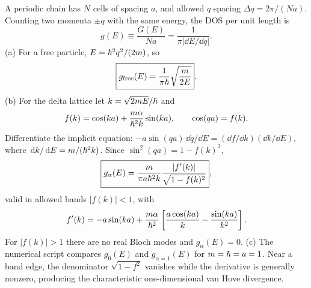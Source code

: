 A periodic chain has $N$ cells of spacing
$a$, and allowed $q$ spacing
$\Delta q=2\pi/(Na)$. Counting two
momenta $\pm q$ with the same energy,
the DOS per unit length is
\begin{equation}
\boxed{g(E)\equiv\frac{G(E)}{Na}
=\frac1{\pi|\dd E/\dd q|}}.
\end{equation}
(a) For a free particle,
$E=\hbar^2q^2/(2m)$, so
\begin{equation}
\boxed{g_{\rm free}(E)
=\frac1{\pi\hbar}\sqrt{\frac{m}{2E}}}.
\end{equation}
(b) For the delta lattice let
$k=\sqrt{2mE}/\hbar$ and
\begin{equation}
f(k)=\cos(ka)+
\frac{m\alpha}{\hbar^2k}\sin(ka),
\qquad \cos(qa)=f(k).
\end{equation}
Differentiate the implicit equation:
$-a\sin(qa)\,\dd q/\dd E
=(\dd f/\dd k)(\dd k/\dd E)$,
where $\,\mathrm d k/\,\mathrm d E=m/(\hbar^2k)$.
Since $\sin^2(qa)=1-f(k)^2$,
\begin{equation}
\boxed{g_\alpha(E)=
\frac{m}{\pi a\hbar^2 k}
\frac{|f'(k)|}{\sqrt{1-f(k)^2}}},
\end{equation}
valid in allowed bands $|f(k)|<1$, with
\begin{equation}
f'(k)=-a\sin(ka)+\frac{m\alpha}{\hbar^2}
\left[\frac{a\cos(ka)}k-
\frac{\sin(ka)}{k^2}\right].
\end{equation}
For $|f(k)|>1$ there are no real
Bloch modes and $g_\alpha(E)=0$.
(c) The numerical script compares
$g_0(E)$ and $g_{\alpha=1}(E)$
for $m=\hbar=a=1$. Near a band edge,
the denominator $\sqrt{1-f^2}$
vanishes while the derivative is
generally nonzero, producing the
characteristic one-dimensional
van Hove divergence.

